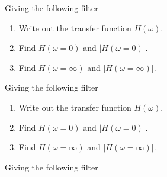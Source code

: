 \begin{enumerate}



\qitem Giving the following filter



\begin{enumerate}
  \item Write out the transfer function $H(\omega)$.
  \item Find  $H(\omega = 0)$ and $|H(\omega = 0)|$.
  \item Find  $H(\omega = \infty)$ and $|H(\omega = \infty)|$.
\end{enumerate}




\qitem Giving the following filter



\begin{enumerate}
  \item Write out the transfer function $H(\omega)$.
  \item Find  $H(\omega = 0)$ and $|H(\omega = 0)|$.
  \item Find  $H(\omega = \infty)$ and $|H(\omega = \infty)|$.
\end{enumerate}




\qitem Giving the following filter




\end{enumerate}
